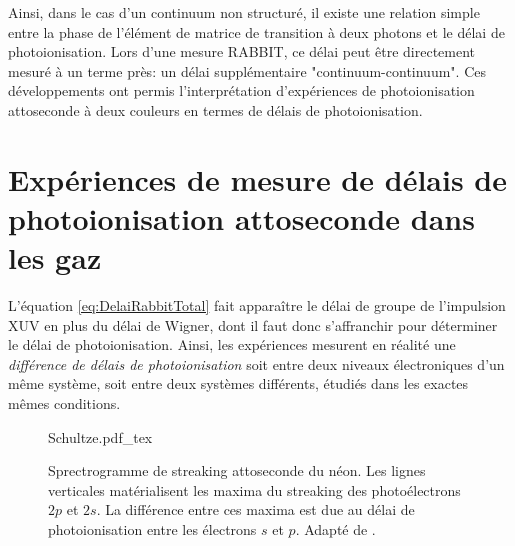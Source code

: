 Ainsi, dans le cas d'un continuum non structuré, il existe une relation simple entre la phase de l'élément de matrice de transition à deux photons et le délai de photoionisation. Lors d'une mesure RABBIT, ce délai peut être directement mesuré à un terme près: un délai supplémentaire "continuum-continuum". Ces développements ont permis l'interprétation d'expériences de photoionisation attoseconde à deux couleurs en termes de délais de photoionisation. 

\section{Expériences de mesure de délais de photoionisation attoseconde dans les gaz}
L'équation \ref{eq:DelaiRabbitTotal} fait apparaître le délai de groupe de l'impulsion XUV en plus du délai de Wigner, dont il faut donc s'affranchir pour déterminer le délai de photoionisation. Ainsi, les expériences mesurent en réalité une \textit{différence de délais de photoionisation} soit entre deux niveaux électroniques d'un même système, soit entre deux systèmes différents, étudiés dans les exactes mêmes conditions.

\begin{figure}[h]
\centering
\def\svgwidth{0.6\columnwidth}
{Schultze.pdf_tex}
\caption{Sprectrogramme de streaking attoseconde du néon. Les lignes verticales matérialisent les maxima du streaking des photoélectrons $2p$ et $2s$. La différence entre ces maxima est due au délai de photoionisation entre les électrons $s$ et $p$. Adapté de .}
\label{fig:Schultze}
\end{figure}

